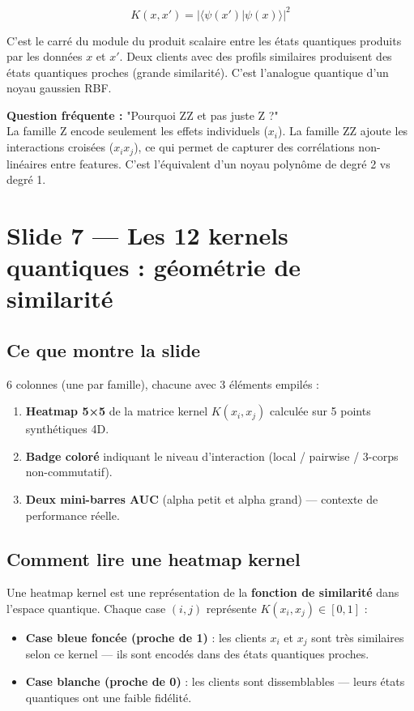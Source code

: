 \documentclass[12pt, a4paper]{article}
\begin{document}
$$K(x, x') = |\langle\psi(x')|\psi(x)\rangle|^2$$

C'est le carré du module du produit scalaire entre les états quantiques
produits par les données $x$ et $x'$. Deux clients avec des profils similaires
produisent des états quantiques proches (grande similarité).
C'est l'analogue quantique d'un noyau gaussien RBF.

\begin{question}
\textbf{Question fréquente :} "Pourquoi ZZ et pas juste Z ?"\\
La famille Z encode seulement les effets individuels ($x_i$).
La famille ZZ ajoute les interactions croisées ($x_i x_j$),
ce qui permet de capturer des corrélations non-linéaires entre features.
C'est l'équivalent d'un noyau polynôme de degré 2 vs degré 1.
\end{question}

\section{Slide 7 — Les 12 kernels quantiques : géométrie de similarité}

\subsection*{Ce que montre la slide}

6 colonnes (une par famille), chacune avec 3 éléments empilés :
\begin{enumerate}
  \item \textbf{Heatmap 5×5} de la matrice kernel $K(x_i, x_j)$ calculée sur 5 points synthétiques 4D.
  \item \textbf{Badge coloré} indiquant le niveau d'interaction (local / pairwise / 3-corps non-commutatif).
  \item \textbf{Deux mini-barres AUC} (alpha petit et alpha grand) — contexte de performance réelle.
\end{enumerate}

\subsection*{Comment lire une heatmap kernel}

Une heatmap kernel est une représentation de la \textbf{fonction de similarité} dans l'espace quantique.
Chaque case $(i,j)$ représente $K(x_i, x_j) \in [0,1]$ :
\begin{itemize}
  \item \textbf{Case bleue foncée (proche de 1)} : les clients $x_i$ et $x_j$ sont très similaires
        selon ce kernel — ils sont encodés dans des états quantiques proches.
  \item \textbf{Case blanche (proche de 0)} : les clients sont dissemblables —
        leurs états quantiques ont une faible fidélité.
\end{itemize}
\end{document}
